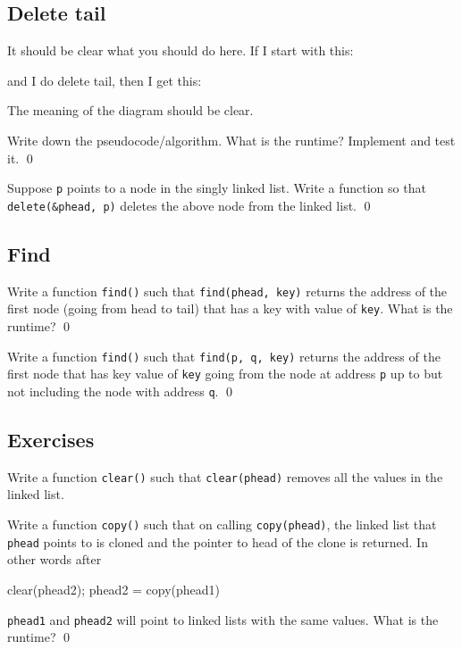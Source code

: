 \newpage
\subsection{Delete tail}

It should be clear what you should do here.
If I start with this:



and I do delete tail, then I get this:



The meaning of the diagram should be clear.

\begin{ex}
Write down the pseudocode/algorithm.
What is the runtime?
Implement and test it.
\qed
\end{ex}

\begin{ex}
Suppose \texttt{p} points to a node in the singly linked list.
Write a function so that \texttt{delete(\&phead, p)}
deletes the above node from the linked list.
\qed
\end{ex}

\newpage
\subsection{Find}

\begin{ex}
Write a function \verb!find()! such that
\verb!find(phead, key)! returns
the address of the first node (going from
head to tail) that has a key with value of \verb!key!.
What is the runtime?
\qed
\end{ex}

\begin{ex}
Write a function \verb!find()! such that
\verb!find(p, q, key)! returns the address of the first node
that has key value of \verb!key! going from the node at
address \verb!p! up to but not including the node with address
\verb!q!.
\qed
\end{ex}


\newpage
\subsection{Exercises}

\begin{ex}
Write a function \verb!clear()! such that
\verb!clear(phead)! removes all the values in the linked list. 
\end{ex}

\begin{ex}
Write a function \verb!copy()! such that
on calling \verb!copy(phead)!, the linked list that \verb!phead!
points to is cloned and the pointer to head of the clone is
returned.
In other words after
\begin{console}[fontsize=\footnotesize]
clear(phead2);
phead2 = copy(phead1)
\end{console}
\verb!phead1! and \verb!phead2! will point to linked lists
with the same values.
What is the runtime?
\qed
\end{ex}


